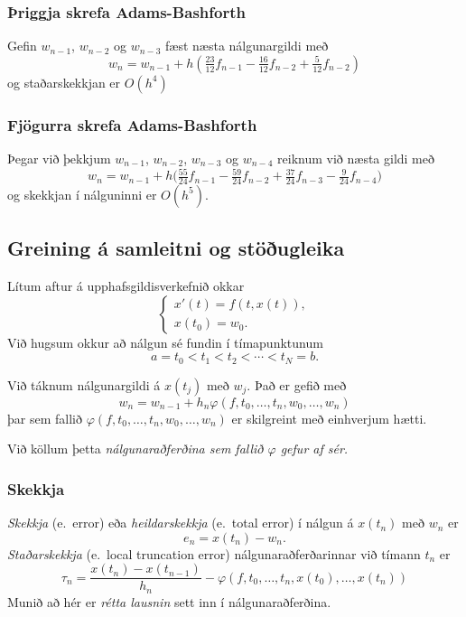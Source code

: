 \documentclass[icelandic,a4paper,12pt]{article}
\begin{document}
\subsubsection{Þriggja skrefa Adams-Bashforth} 
Gefin $w_{n-1}$, $w_{n-2}$ og $w_{n-3}$ fæst næsta nálgunargildi með
\begin{equation*}
  w_{n} = w_{n-1} + {h}(\tfrac{23}{12} f_{n-1} - \tfrac {16}{12}
  f_{n-2} + \tfrac 5{12} f_{n-2})
\end{equation*}
og staðarskekkjan er $O(h^4)$



\subsubsection{Fjögurra skrefa Adams-Bashforth} 
Þegar við þekkjum $w_{n-1}$, $w_{n-2}$, $w_{n-3}$ og $w_{n-4}$ 
reiknum við næsta gildi með
\begin{equation*}
  w_{n} = w_{n-1} + h\big(\tfrac{55}{24}f_{n-1} - \tfrac{59}{24}f_{n-2} + 
\tfrac {37}{24}f_{n-3} -\tfrac 9{24}f_{n-4}\big)
\end{equation*}
og skekkjan í nálguninni er $O(h^5)$.



\subsection{Greining á samleitni og stöðugleika} 
Lítum aftur á upphafsgildisverkefnið okkar
$$
\begin{cases}
  x'(t)=f(t,x(t)),\\
x(t_0)=w_0.
\end{cases}
$$
Við hugsum okkur að nálgun sé fundin í tímapunktunum
$$a=t_0<t_1<t_2<\cdots<t_N=b.$$

\pause
\smallskip
Við táknum nálgunargildi  á $x(t_j)$ með $w_j$. 
Það er gefið með 
$$
w_n=w_{n-1}+h_n\varphi(f,t_{0},\dots,t_n,w_{0},\dots,w_{n})
$$
þar sem fallið $\varphi(f,t_{0},\dots,t_n,w_{0},\dots,w_{n})$
er skilgreint með einhverjum hætti.  

\pause
\smallskip
Við köllum þetta {\it nálgunaraðferðina sem fallið
$\varphi$ gefur af sér.} 



\subsubsection{Skekkja}
{\it Skekkja} (e.~error) eða  {\it heildarskekkja} 
(e.~total error) í nálgun
á $x(t_n)$ með $w_n$ er 
$$
e_n=x(t_n)-w_n.
$$
\pause
{\it Staðarskekkja} (e.~local truncation error)
nálgunaraðferðarinnar við tímann $t_n$ er
$$
\tau_n=\dfrac{x(t_n)-x(t_{n-1})}{h_n}
-\varphi(f,t_{0},\dots,t_n,x(t_{0}),\dots,x(t_{n}))
$$
Munið að hér er {\it rétta lausnin} sett inn í 
nálgunaraðferðina.
\end{document}

